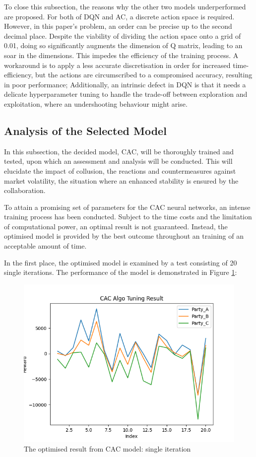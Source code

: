 \documentclass[11pt,twoside]{article}
\numberwithin{Theorem}{section}
\numberwithin{Definition}{section}
\numberwithin{Lemma}{section}
\numberwithin{Algorithm}{section}
\numberwithin{equation}{section}
\begin{document}
To close this subsection, the reasons why the other two models underperformed are proposed. For both of DQN and AC, a discrete action space is required. However, in this paper's problem, an order can be precise up to the second decimal place. Despite the viability of dividing the action space onto a grid of 0.01, doing so significantly augments the dimension of Q matrix, leading to an soar in the dimensions. This impedes the efficiency of the training process. A workaround is to apply a less accurate discretisation in order for increased time-efficiency, but the actions are circumscribed to a compromised accuracy, resulting in poor performance;  Additionally, an intrinsic defect in DQN is that it needs a delicate hyperparameter tuning to handle the trade-off between exploration and exploitation, where an undershooting behaviour might arise.

\clearpage

\subsection{Analysis of the Selected Model}
In this subsection, the decided model, CAC, will be thoroughly trained and tested, upon which an assessment and analysis will be conducted. This will elucidate the impact of collusion, the reactions and countermeasures against market volatility, the situation where an enhanced stability is ensured by the collaboration.

To attain a promising set of parameters for the CAC neural networks, an intense training process has been conducted. Subject to the time costs and the limitation of computational power, an optimal result is not guaranteed. Instead, the optimised model is provided by the best outcome throughout an training of an acceptable amount of time.

In the first place, the optimised model is examined by a test consisting of 20 single iterations. The performance of the model is demonstrated in Figure \ref{fig:single}:
\begin{figure}[h]
    \centering
    \includegraphics[scale=0.7]{images/CAC_2.png}
    \caption{The optimised result from CAC model: single iteration}
    \label{fig:single}
\end{figure}
\end{document}
